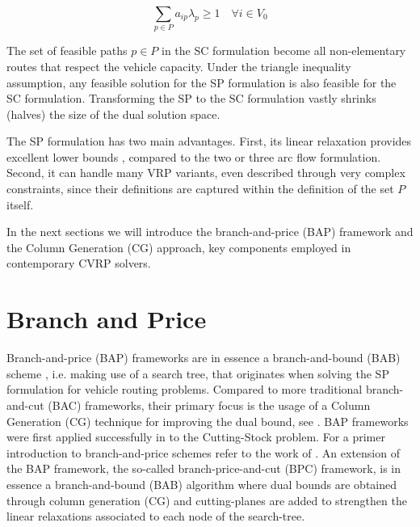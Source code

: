 \begin{equation}\label{eq:set-covering-customers-visited-by-exactly-one-route}
	\sum_{p \in P}  a_{ip} \lambda_p \ge 1  \quad \forall i \in V_0
\end{equation}

The set of feasible paths $p \in P$ in the SC formulation
become all non-elementary routes that respect the vehicle capacity.
Under the triangle inequality assumption,
any feasible solution for the SP formulation is also feasible for the SC formulation.
Transforming the SP to the SC formulation vastly shrinks (halves) the size of the dual solution space.

\medskip


The SP formulation has two main advantages.
First, its linear relaxation provides excellent lower bounds \parencite{bramel1997},
compared to the two or three arc flow formulation.
Second, it can handle many VRP variants,
even described through very complex constraints,
since their definitions are captured within the definition of the set $P$ itself.


\medskip

In the next sections we will introduce
the branch-and-price (BAP) framework and the Column Generation (CG) approach,
key components employed in contemporary CVRP solvers.


\section{Branch and Price}
\label{sec:intro-branch-and-price}

Branch-and-price (BAP) frameworks are in essence a branch-and-bound (BAB) scheme \parencite{land2010},
i.e. making use of a search tree,
that originates when solving the SP formulation for vehicle routing problems.
Compared to more traditional branch-and-cut (BAC) frameworks,
their primary focus is the usage of a Column Generation (CG) technique for improving the dual bound,
see \textcite{righini2008}.
BAP frameworks were first applied successfully in \textcite{gilmore1961} to the Cutting-Stock problem.
For a primer introduction to branch-and-price schemes refer to the work of \textcite{barnhart1998}.
An extension of the BAP framework, the so-called branch-price-and-cut (BPC) framework,
is in essence a branch-and-bound (BAB) algorithm where dual bounds are obtained through column generation (CG)
and cutting-planes are added to strengthen the linear relaxations associated to each node of the search-tree.


